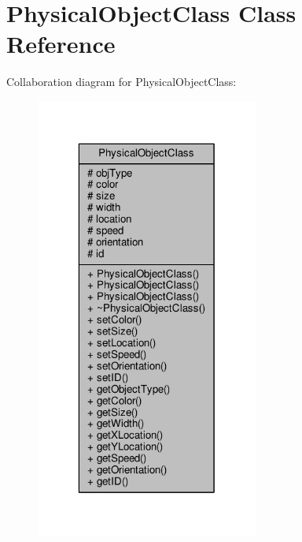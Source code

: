 \hypertarget{classPhysicalObjectClass}{\section{Physical\-Object\-Class Class Reference}
\label{classPhysicalObjectClass}
}


Collaboration diagram for Physical\-Object\-Class\-:\nopagebreak
\begin{figure}[H]
\begin{center}
\leavevmode
\includegraphics[width=208pt]{classPhysicalObjectClass__coll__graph}
\end{center}
\end{figure}
